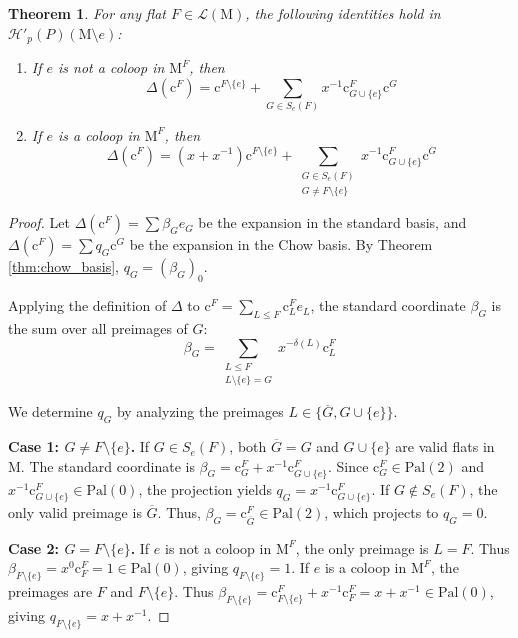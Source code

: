 \documentclass{article}
\newcommand{\M}{\mathrm{M}}
\newcommand{\Pal}[1]{\mathrm{Pal}(#1)}
\newcommand{\Cbasis}[1]{\mathrm{c}^{#1}}
\newcommand{\CbasisSub}[2]{\mathrm{c}^{#1}_{#2}}
\newcommand{\cbasis}[1]{\mathcal{H}'_{#1}(P)}
\newtheorem{theorem}{Theorem}[section]
\theoremstyle{definition}
\theoremstyle{remark}
\begin{document}
\begin{theorem} \label{thm:deletion_expansion}
    For any flat \(F \in \mathcal{L}(\M)\), the following identities hold in \(\cbasis{p}(\M \setminus e)\):
    \begin{enumerate}
        \item If \(e\) is not a coloop in \(\M^F\), then
              \begin{equation} \label{eq:delta_noncoloop}
                  \Delta(\Cbasis{F}) = \Cbasis{F \setminus \{e\}} + \sum_{G \in S_e(F)} x^{-1} \CbasisSub{F}{G \cup \{e\}} \Cbasis{G}
              \end{equation}
        \item If \(e\) is a coloop in \(\M^F\), then
              \begin{equation} \label{eq:delta_coloop}
                  \Delta(\Cbasis{F}) = (x+x^{-1})\Cbasis{F \setminus \{e\}} + \sum_{\substack{G \in S_e(F) \\ G \neq F \setminus \{e\}}} x^{-1} \CbasisSub{F}{G \cup \{e\}} \Cbasis{G}
              \end{equation}
    \end{enumerate}
\end{theorem}

\begin{proof}
    Let \(\Delta(\Cbasis{F}) = \sum \beta_G e_G\) be the expansion in the standard basis, and \(\Delta(\Cbasis{F}) = \sum q_G \Cbasis{G}\) be the expansion in the Chow basis. By Theorem \ref{thm:chow_basis}, \(q_G = (\beta_G)_0\).
    
    Applying the definition of \(\Delta\) to \(\Cbasis{F} = \sum_{L \le F} \CbasisSub{F}{L} e_L\), the standard coordinate \(\beta_G\) is the sum over all preimages of \(G\):
    \[ \beta_G = \sum_{\substack{L \le F \\ L \setminus \{e\} = G}} x^{-\delta(L)} \CbasisSub{F}{L} \]
    
    We determine \(q_G\) by analyzing the preimages \(L \in \{\overline{G}, G \cup \{e\}\}\).
    
    \textbf{Case 1: \(G \neq F \setminus \{e\}\).} 
    If \(G \in S_e(F)\), both \(\overline{G} = G\) and \(G \cup \{e\}\) are valid flats in \(\M\). The standard coordinate is \(\beta_G = \CbasisSub{F}{G} + x^{-1}\CbasisSub{F}{G\cup \{e\}}\). Since \(\CbasisSub{F}{G} \in \Pal{2}\) and \(x^{-1}\CbasisSub{F}{G\cup \{e\}} \in \Pal{0}\), the projection yields \(q_G = x^{-1}\CbasisSub{F}{G\cup \{e\}}\). 
    If \(G \notin S_e(F)\), the only valid preimage is \(\overline{G}\). Thus, \(\beta_G = \CbasisSub{F}{\overline{G}} \in \Pal{2}\), which projects to \(q_G = 0\).

    \textbf{Case 2: \(G = F \setminus \{e\}\).} 
    If \(e\) is not a coloop in \(\M^F\), the only preimage is \(L=F\). Thus \(\beta_{F\setminus \{e\}} = x^0 \CbasisSub{F}{F} = 1 \in \Pal{0}\), giving \(q_{F \setminus \{e\}} = 1\).
    If \(e\) is a coloop in \(\M^F\), the preimages are \(F\) and \(F \setminus \{e\}\). Thus \(\beta_{F\setminus \{e\}} = \CbasisSub{F}{F\setminus \{e\}} + x^{-1}\CbasisSub{F}{F} = x + x^{-1} \in \Pal{0}\), giving \(q_{F \setminus \{e\}} = x + x^{-1}\).
\end{proof}
\end{document}

